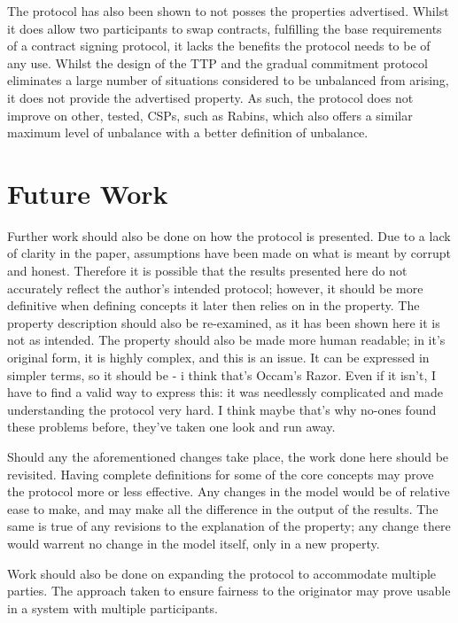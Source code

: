 \documentclass{l4proj}
\begin{document}
The protocol has also been shown to not posses the properties advertised. Whilst it does allow two participants to swap contracts, fulfilling the base requirements of a contract signing protocol, it lacks the benefits the protocol needs to be of any use. Whilst the design of the TTP and the gradual commitment protocol eliminates a large number of situations considered to be unbalanced from arising, it does not provide the advertised property. As such, the protocol does not improve on other, tested, CSPs, such as Rabins, which also offers a similar maximum level of unbalance with a better definition of unbalance.



\section{Future Work}


Further work should also be done on how the protocol is presented. Due to a lack of clarity in the paper, assumptions have been made on what is meant by corrupt and honest. Therefore it is possible that the results presented here do not accurately reflect the author's intended protocol; however, it should be more definitive when defining concepts it later then relies on in the property. The property description should also be re-examined, as it has been shown here it is not as intended. The property should also be made more human readable; in it's original form, it is highly complex, and this is an issue. It can be expressed in simpler terms, so it should be - i think that's Occam's Razor. Even if it isn't, I have to find a valid way to express this: it was needlessly complicated and made understanding the protocol very hard. I think maybe that's why no-ones found these problems before, they've taken one look and run away.

Should any the aforementioned changes take place, the work done here should be revisited. Having complete definitions for some of the core concepts may prove the protocol more or less effective. Any changes in the model would be of relative ease to make, and may make all the difference in the output of the results. The same is true of any revisions to the explanation of the property; any change there would warrent no change in the model itself, only in a new property.

Work should also be done on expanding the protocol to accommodate multiple parties. The approach taken to ensure fairness to the originator may prove usable in a system with multiple participants.
\end{document}
